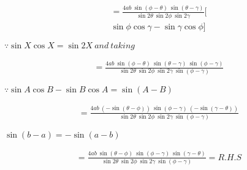 \documentclass[journal,12pt,twocolumn]{IEEEtran}
\begin{document}
\vspace{0.3cm}
\begin{multline}
    =\frac{4ab~ \sin(\phi-\theta)~\sin(\theta-\gamma) }{\sin2\theta~\sin2\phi~\sin2\gamma}[ \\ \sin\phi\cos\gamma - \sin\gamma\cos\phi
    ]
\end{multline}
\begin{flushright}
$\because \sin X \cos X = \sin2X ~and ~taking ~ $
\end{flushright}

\vspace{0.3cm}
\begin{multline}
    =\frac{4ab~ \sin(\phi-\theta)~\sin(\theta-\gamma)~\sin(\phi-\gamma) }{\sin2\theta~\sin2\phi~\sin2\gamma~\sin(\phi-\gamma)}
\end{multline}
\begin{flushright}
$\because \sin A\cos B - \sin B\cos A = \sin(A-B)$
\end{flushright}

\vspace{0.3cm}
\begin{multline}
    =\frac{4ab~(-\sin(\theta-\phi))~\sin(\phi-\gamma)~(-\sin(\gamma-\theta) )}{\sin2\theta~\sin2\phi~\sin2\gamma~\sin(\phi-\gamma)}
\end{multline}
\begin{flushright}
$\sin (b-a)=-\sin (a-b) $
\end{flushright}

\vspace{0.3cm}
\begin{multline*}
    =\frac{4ab~\sin(\theta-\phi)~\sin(\phi-\gamma)~\sin(\gamma-\theta) }{\sin2\theta~\sin2\phi~\sin2\gamma~\sin(\phi-\gamma)} = R.H.S
\end{multline*}
\end{document}
